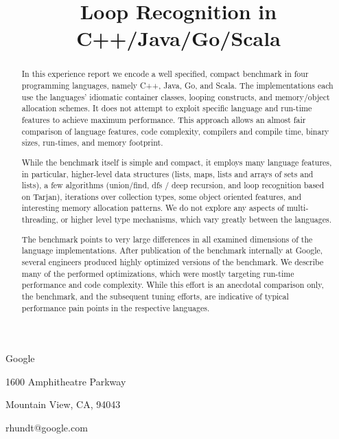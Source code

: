 \documentclass[10pt,conference]{IEEEtran}
\begin{document}
\ifieee
\else
{} 
\copyrightdata{[to be supplied]} 
\fi


\title{Loop Recognition in C++/Java/Go/Scala}

\ifsubmit 
\ifieee
\author{
       }

\else
{}
           {Google\par
            1600 Amphitheatre Parkway\par
            Mountain View, CA, 94043
            }
           {rhundt@google.com}
\fi
\else
\authorinfo{}{}{}
\fi
\maketitle
\begin{abstract}
In this experience report we encode a well specified, compact
benchmark in four programming languages, namely C++, Java, Go, and
Scala.  The implementations each use the languages' idiomatic
container classes, looping constructs, and memory/object allocation
schemes. It does not attempt to exploit specific language and run-time
features to achieve maximum performance.  This approach allows an
almost fair comparison of language features, code complexity,
compilers and compile time, binary sizes, run-times, and memory
footprint.
 
While the benchmark itself is simple and compact, it employs many
language features, in particular, higher-level data structures (lists,
maps, lists and arrays of sets and lists), a few algorithms
(union/find, dfs / deep recursion, and loop recognition based on
Tarjan), iterations over collection types, some object oriented
features, and interesting memory allocation patterns.  We do not
explore any aspects of multi-threading, or higher level type
mechanisms, which vary greatly between the languages.

The benchmark points to very large differences in all examined
dimensions of the language implementations. After publication of the
benchmark internally at Google, several engineers produced highly
optimized versions of the benchmark. We describe many of the performed
optimizations, which were mostly targeting run-time performance and code
complexity. While this effort is an anecdotal comparison only,
the benchmark, and the subsequent tuning efforts, are indicative of
typical performance pain points in the respective languages.

\end{abstract}
\end{document}
